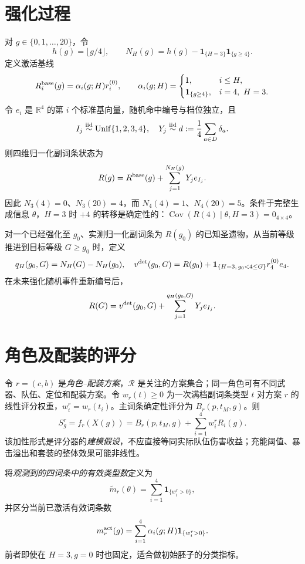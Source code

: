 \documentclass[11pt,a4paper]{ctexart}
\newcommand{\Ind}{\mathbf 1}
\newcommand{\Unif}{\operatorname{Unif}}
\begin{document}
\section{强化过程}
对 $g\in\{0,1,\ldots,20\}$，令
\[
h(g)=\lfloor g/4\rfloor,\qquad N_H(g)=h(g)-\Ind_{\{H=3\}}\Ind_{\{g\ge4\}}.
\]
定义激活基线
\[
R^{\rm base}_i(g)=\alpha_i(g;H)r_i^{(0)},\qquad
\alpha_i(g;H)=
\begin{cases}
1,&i\le H,\\
\Ind_{\{g\ge4\}},&i=4,\ H=3.
\end{cases}
\]
令 $e_i$ 是 $\mathbb R^4$ 的第 $i$ 个标准基向量，随机命中编号与档位独立，且
\[
I_j\overset{\rm iid}{\sim}\Unif\{1,2,3,4\},\quad
Y_j\overset{\rm iid}{\sim}d:=\frac14\sum_{a\in D}\delta_a.
\]
则四维归一化副词条状态为
\begin{equation}\label{eq:state}
R(g)=R^{\rm base}(g)+\sum_{j=1}^{N_H(g)}Y_je_{I_j}.
\end{equation}
因此 $N_3(4)=0$、$N_3(20)=4$，而 $N_4(4)=1$、$N_4(20)=5$。条件于完整生成信息 $\theta$，$H=3$ 时 $+4$ 的转移是确定性的：$\operatorname{Cov}(R(4)\mid\theta,H=3)=0_{4\times4}$。

对一个已经强化至 $g_0$、实测归一化副词条为 $R(g_0)$ 的已知圣遗物，从当前等级推进到目标等级 $G\ge g_0$ 时，定义
\[
q_H(g_0,G)=N_H(G)-N_H(g_0),\quad
v^{\rm det}(g_0,G)=R(g_0)+\Ind_{\{H=3,\,g_0<4\le G\}}r_4^{(0)}e_4.
\]
在未来强化随机事件重新编号后，
\begin{equation}\label{eq:forecast}
R(G)=v^{\rm det}(g_0,G)+\sum_{j=1}^{q_H(g_0,G)}Y_je_{I_j}.
\end{equation}

\section{角色及配装的评分}
令 $r=(c,b)$ 是\emph{角色--配装方案}，$\mathcal R$ 是关注的方案集合；同一角色可有不同武器、队伍、定位和配装方案。令 $w_r(t)\ge0$ 为一次满档副词条类型 $t$ 对方案 $r$ 的线性评分权重，$w^r_i=w_r(t_i)$。主词条确定性评分为 $B_r(p,t_M,g)$。则
\begin{equation}\label{eq:score}
S_g^r=f_r(X(g))=B_r(p,t_M,g)+\sum_{i=1}^4w_i^rR_i(g).
\end{equation}
该加性形式是评分器的\emph{建模假设}，不应直接等同实际队伍伤害收益；充能阈值、暴击溢出和套装的整体效果可能非线性。

将\emph{观测到的四词条中的有效类型数}定义为
\[
\widetilde m_r(\theta)=\sum_{i=1}^4\Ind_{\{w_i^r>0\}},
\]
并区分当前已激活有效词条数
\[
m_r^{\rm act}(g)=\sum_{i=1}^4\alpha_i(g;H)\Ind_{\{w_i^r>0\}}.
\]
前者即使在 $H=3,g=0$ 时也固定，适合做初始胚子的分类指标。
\end{document}
